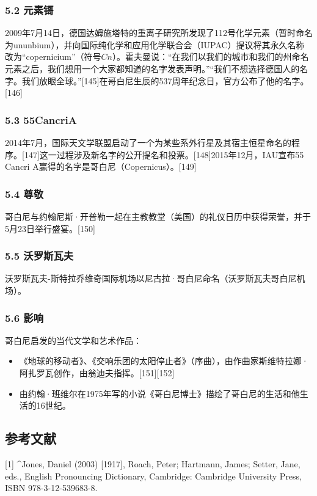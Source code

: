 \subsubsection{5.2 元素鿔}
2009年7月14日，德国达姆施塔特的重离子研究所发现了112号化学元素（暂时命名为ununbium），并向国际纯化学和应用化学联合会（IUPAC）提议将其永久名称改为“copernicium”（符号$Cn$）。霍夫曼说：“在我们以我们的城市和我们的州命名元素之后，我们想用一个大家都知道的名字发表声明。”“我们不想选择德国人的名字。我们放眼全球。”[145]在哥白尼生辰的537周年纪念日，官方公布了他的名字。[146]

\subsubsection{5.3 55CancriA}
2014年7月，国际天文学联盟启动了一个为某些系外行星及其宿主恒星命名的程序。[147]这一过程涉及新名字的公开提名和投票。[148]2015年12月，IAU宣布55 Cancri A赢得的名字是哥白尼（Copernicus）。[149]

\subsubsection{5.4 尊敬}
哥白尼与约翰尼斯·开普勒一起在主教教堂（美国）的礼仪日历中获得荣誉，并于5月23日举行盛宴。[150]

\subsubsection{5.5 沃罗斯瓦夫}
沃罗斯瓦夫-斯特拉乔维奇国际机场以尼古拉·哥白尼命名（沃罗斯瓦夫哥白尼机场）。

\subsubsection{5.6 影响}
哥白尼启发的当代文学和艺术作品：
\begin{itemize}
\item 《地球的移动者》、《交响乐团的太阳停止者》（序曲），由作曲家斯维特拉娜·阿扎罗瓦创作，由翁迪夫指挥。[151][152]
\item 由约翰·班维尔在1975年写的小说《哥白尼博士》描绘了哥白尼的生活和他生活的16世纪。
\end{itemize}

\subsection{参考文献}
[1]
^Jones, Daniel (2003) [1917], Roach, Peter; Hartmann, James; Setter, Jane, eds., English Pronouncing Dictionary, Cambridge: Cambridge University Press, ISBN 978-3-12-539683-8.

